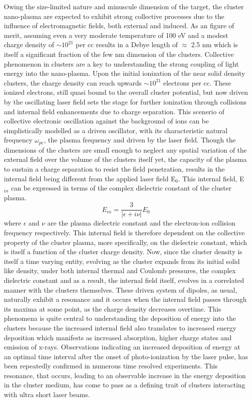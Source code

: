 \documentclass[a4paper,12pt]{article}
\begin{document}
Owing the size-limited nature and minuscule dimension of the target, the cluster nano-plasma are expected to exhibit strong collective processes due to the influence of electromagnetic fields, both external and induced. As an figure of merit, assuming even a very moderate temperature of 100 eV and a modest charge density of $\sim 10^{21}$ per cc results in a Debye length of $\approx$ 2.5 nm which is itself a significant fraction of the few nm dimension of the clusters. Collective phenomenon in clusters are a key to understanding the strong coupling of light energy into the nano-plasma. Upon the initial ionization of the near solid density clusters, the charge density can reach upwards $\sim 10^{21}$ electrons per cc. These ionized electrons, still quasi bound to the overall cluster potential, but now driven by the oscillating laser field sets the stage for further ionization through collisions and internal field enhancements due to charge separation. This scenerio of collective electronic oscillation against the background of ions can be simplistically modelled as a driven oscillator, with its characteristic natural frequency $\omega_{pe}$, the plasma frequency and driven by the laser field. Though the dimensions of the clusters are small enough to neglect any spatial variation of the external field over the volume of the clusters itself yet, the capacity of the plasma to sustain a charge separation to resist the field penetration, results in the internal field being different from the applied laser field E$_{0}$. This internal field, E$_{in}$ can be expressed in terms of the complex dielectric constant of the cluster plasma.
\begin{equation}\label{eqn1}
E_{in}=\frac{3}{|\epsilon + i\nu|}E_{0}
\end{equation}
where \({\epsilon}\) and \({\nu}\) are the plasma dielectric constant and the electron-ion collision frequency respectively. This internal field is therefore dependent on the collective property of the cluster plasma, more specifically, on the dielectric constant, which is itself a function of the cluster charge density. Now, since the cluster density is itself a time varying entity, evolving as the cluster expands from its initial solid like density, under both internal thermal and Coulomb pressures, the complex dielectric constant and as a result, the internal field itself, evolves in a correlated manner with the clusters themselves. These driven system of dipoles, as usual, naturally exhibit a resonance and it occurs when the internal field passes through its maxima at some point, as the charge density decreases overtime. This phenomena is quite central to understanding the deposition of energy into the clusters because the increased internal field also translates to increased energy deposition which manifests as increased absorption, higher charge states and emission of x-rays\cite{xrayissac,zweibeck}. Observations indicating an increased deposition of energy at an optimal time interval after the onset of photo-ionization by the laser pulse, has been repeatedly confirmed in numerous time resolved experiments. This resonance, that occurs, leading to an observable increase in the energy deposition in the cluster medium, has come to pass as a defining trait of clusters interacting with ultra short laser beams. 
\end{document}
